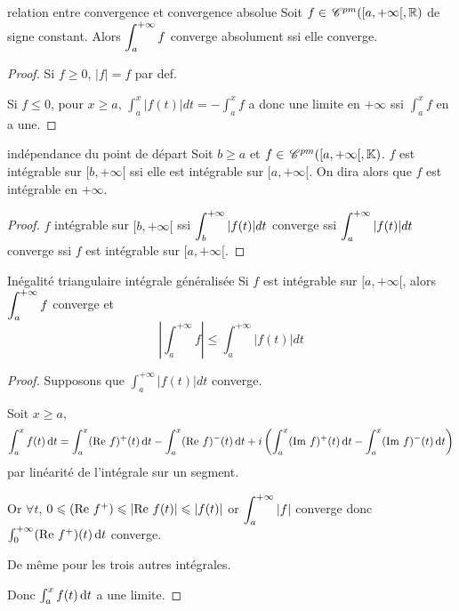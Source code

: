 \begin{proposition}{relation entre convergence et convergence absolue}{}
    Soit $f \in \,\mathscr C^{pm}([a, + \infty[, \mathbb{R})$ de signe constant. Alors 
    $\displaystyle \int_a^{+ \infty} f$ converge absolument ssi elle converge. 
\end{proposition}

\begin{proof}
    Si $f \geqslant 0$, $|f| = f$ par def. 

    Si $f \leqslant 0$, pour $x \geqslant a$, $\int_a^x |f(t)| dt = - \int_a^x f$ a donc une 
    limite en $+ \infty$ ssi $\int_a^x f$ en a une.
\end{proof}

\begin{proposition}{indépendance du point de départ}{}
    Soit $b \geqslant a$ et $f \in \,\mathscr C^{pm}([a, + \infty[, \mathbb{K})$. 
    $f$ est intégrable sur $[b, + \infty[$ ssi elle est intégrable sur $[a, + \infty[$.
    On dira alors que $f$ est intégrable en $+ \infty$.
\end{proposition}

\begin{proof}
    $f$ intégrable sur $[b, + \infty[$ ssi $\displaystyle \int_b^{+ \infty} |f(t)| dt$ converge
    ssi $\displaystyle \int_a^{+ \infty} |f(t)| dt $ converge ssi $f$ est intégrable sur $[a, + \infty[$.
\end{proof}

\begin{theoreme}{Inégalité triangulaire intégrale généralisée}{}
    Si $f$ est intégrable sur $[a, + \infty[$, alors $\displaystyle \int_a^{+ \infty} f$ converge et 
    $$\left| \int_{a }^{+\infty} f \right| \leqslant \int_{a }^{+\infty} |f(t)| dt $$
\end{theoreme}


\begin{proof}
    Supposons que $\int_a^{+ \infty} |f(t)| dt$ converge.

    Soit $x \geqslant a$,
    $$\int_a^x f(t) \,\mathrm{d}t = \int_a^x (\operatorname{Re} \, f)^+(t) \,\mathrm{d}t - \int_a^x (\operatorname{Re} \, f)^-(t) \,\mathrm{d}t + i \left( \int_a^x (\operatorname{Im} \, f)^+(t) \,\mathrm{d}t - \int_a^x (\operatorname{Im} \, f)^-(t) \,\mathrm{d}t \right)$$
    par linéarité de l'intégrale sur un segment.

    Or $\forall t$, $0 \leqslant (\operatorname{Re} \, f^+) \leqslant \left| \operatorname{Re} \, f(t) \right| \leqslant |f(t)|$ or 
    $\displaystyle \int_{a }^{+ \infty   } |f| $ converge donc $\int_0^{+ \infty} (\operatorname{Re} \, f^+)(t) \,\mathrm{d}t$ converge. 

    De même pour les trois autres intégrales.

    Donc $\int_a^x f(t) \,\mathrm{d}t$ a une limite. 
\end{proof}

